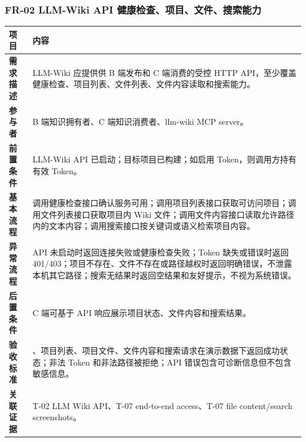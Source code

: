 \documentclass[UTF8,a4paper,12pt,fontset=fandol]{ctexart}
\newcommand{\code}[1]{\texorpdfstring{\begingroup\footnotesize\detokenize{#1}\endgroup}{#1}}
\begin{document}
\subsubsection{FR-02 LLM-Wiki API 健康检查、项目、文件、搜索能力}
\begin{longtable}{>{\bfseries}p{2.4cm}p{11.8cm}}
\toprule
项目 & 内容 \\
\midrule
需求描述 & LLM-Wiki 应提供供 B 端发布和 C 端消费的受控 HTTP API，至少覆盖健康检查、项目列表、文件列表、文件内容读取和搜索能力。 \\
参与者 & B 端知识拥有者、C 端知识消费者、llm-wiki MCP server。 \\
前置条件 & LLM-Wiki API 已启动；目标项目已构建；如启用 Token，则调用方持有有效 Token。 \\
基本流程 & 调用健康检查接口确认服务可用；调用项目列表接口获取可访问项目；调用文件列表接口获取项目内 Wiki 文件；调用文件内容接口读取允许路径内的文本内容；调用搜索接口按关键词或语义检索项目内容。 \\
异常流程 & API 未启动时返回连接失败或健康检查失败；Token 缺失或错误时返回 401/403；项目不存在、文件不存在或路径越权时返回明确错误，不泄露本机其它路径；搜索无结果时返回空结果和友好提示，不视为系统错误。 \\
后置条件 & C 端可基于 API 响应展示项目状态、文件内容和搜索结果。 \\
验收标准 & \code{/api/v1/health}、项目列表、项目文件、文件内容和搜索请求在演示数据下返回成功状态；非法 Token 和非法路径被拒绝；API 错误包含可诊断信息但不包含敏感信息。 \\
关联证据 & T-02 LLM Wiki API、T-07 end-to-end access、T-07 file content/search screenshots。 \\
\bottomrule
\end{longtable}
\end{document}

